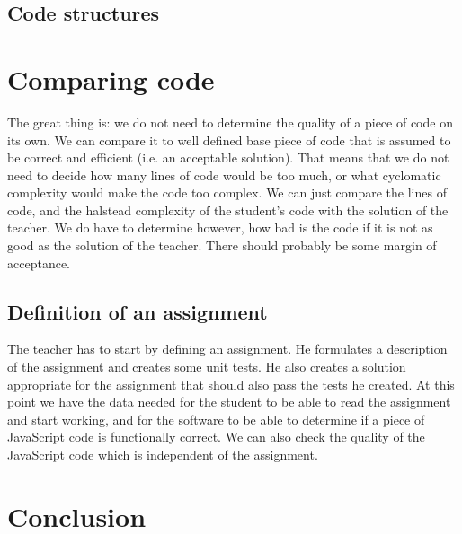 \documentclass{article}
\begin{document}
\subsection{Code structures}

\section{Comparing code}

The great thing is: we do not need to determine the quality of a piece of code
on its own. We can compare it to well defined base piece of code that is
assumed to be correct and efficient (i.e. an acceptable solution). That means
that we do not need to decide how many lines of code would be too much, or what
cyclomatic complexity would make the code too complex. We can just compare the
lines of code, and the halstead complexity of the student's code with the
solution of the teacher. We do have to determine however, how bad is the code
if it is not as good as the solution of the teacher. There should probably be
some margin of acceptance.

\subsection{Definition of an assignment}

The teacher has to start by defining an assignment. He formulates a description
of the assignment and creates some unit tests. He also creates a solution
appropriate for the assignment that should also pass the tests he created. At
this point we have the data needed for the student to be able to read the
assignment and start working, and for the software to be able to determine if a
piece of JavaScript code is functionally correct. We can also check the quality
of the JavaScript code which is independent of the assignment.

\section{Conclusion}



\end{document}
